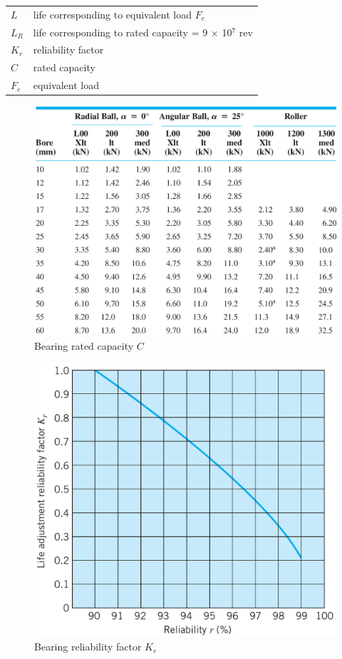 \documentclass[a4paper,openany]{tufte-book}
\begin{document}
\begin{center}
\begin{tabular}{ll}
\(L\) & life corresponding to equivalent load \(F_e\)\\
\(L_R\) & life corresponding to rated capacity = 9 \(\times\) 10\(^7\) rev\\
\(K_r\) & reliability factor\\
\(C\) & rated capacity\\
\(F_e\) & equivalent load\\
\end{tabular}
\end{center}


\begin{figure}[htbp]
\centering
\includegraphics[width=.9\linewidth]{./pictures/Bearings/bearing-rated-capacity.png}
\caption{Bearing rated capacity \(C\)}
\end{figure}

\begin{figure}[htbp]
\centering
\includegraphics[width=.9\linewidth]{./pictures/Bearings/reliability-factor.png}
\caption{Bearing reliability factor \(K_r\)}
\end{figure}
\end{document}
